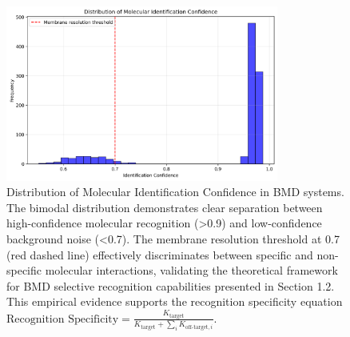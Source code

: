 \begin{figure}[htbp]
\centering
\includegraphics[width=0.8\textwidth]{images/molecular_recognition.png}
\caption{Distribution of Molecular Identification Confidence in BMD systems. The bimodal distribution demonstrates clear separation between high-confidence molecular recognition (>0.9) and low-confidence background noise (<0.7). The membrane resolution threshold at 0.7 (red dashed line) effectively discriminates between specific and non-specific molecular interactions, validating the theoretical framework for BMD selective recognition capabilities presented in Section 1.2. This empirical evidence supports the recognition specificity equation $\text{Recognition Specificity} = \frac{K_{\text{target}}}{K_{\text{target}} + \sum_{i} K_{\text{off-target},i}}$.}
\label{fig:molecular_recognition}
\end{figure}

